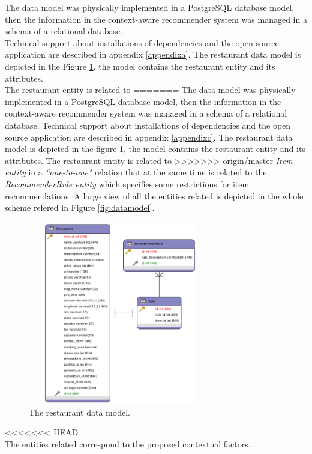 The data model was physically implemented in a PostgreSQL database model, 
then the information in the context-aware recommender system was
managed in a schema of a relational database. \\ Technical support 
about installations of dependencies and the open source application are 
described in appendix  \ref{appendixa}.
The restaurant data model is depicted in the 
Figure  \ref{fig:restaurantmodeldata}, the model contains the restaurant
entity and its attributes. \\ The restaurant entity is related to
=======
The data model was physically implemented in a PostgreSQL database model, 
then the information in the context-aware recommender system was
managed in a schema of a relational database. Technical support 
about installations of dependencies and the open source application are 
described in appendix \ref{appendixc}.
The restaurant data model is depicted in the figure
\ref{fig:restaurantmodeldata}, the model contains the restaurant
entity and its attributes. The restaurant entity is related to
>>>>>>> origin/master
\textit{Item entity} in a \textit{``one-to-one"} relation that at the
same time is related to the \textit{RecommenderRule entity} which
specifies some restrictions for item recommendations. A large view of
all the entities related is depicted in the whole scheme refered in
Figure  \ref{fig:datamodel}.
\begin{figure}
\captionsetup{justification=centering,margin=2cm,font=footnotesize}
\centering
\includegraphics[width=8cm,height=8cm,keepaspectratio]{img/data-resmodel.png}
\caption{The restaurant data model.}
\label{fig:restaurantmodeldata}     
\end{figure}
<<<<<<< HEAD
\\ The entities related correspond to the proposed contextual factors, 
